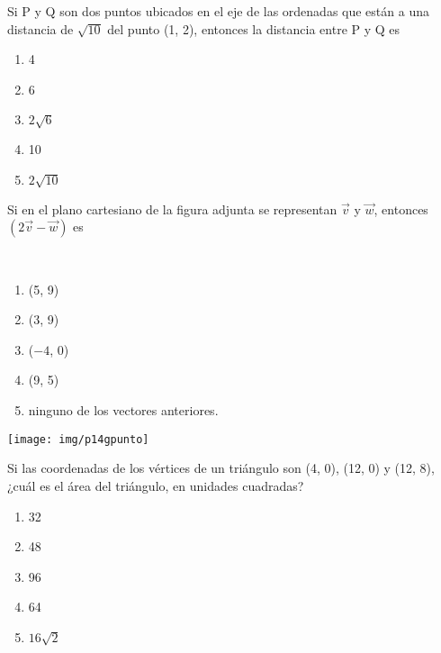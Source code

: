 \begin{enumerate}[label=\large{\textbf{\arabic*.}}, itemsep = 0.15cm, topsep = 0.5cm]
	\parbox{1\linewidth}{ \item Si P y Q son dos puntos ubicados en el eje de las ordenadas que están a una distancia de $\sqrt{10}$ del punto (1, 2), entonces la distancia entre P y Q es 
		\begin{enumerate}[label={\Alph*)}, itemsep = 0.15cm, topsep = 0.5cm]
			\item 4
			\item 6
			\item $2\sqrt{6}$
			\item 10
			\item $2\sqrt{10}$
	\end{enumerate}}
	
	\parbox{1\linewidth}{\item Si en el plano cartesiano de la figura adjunta se representan $\vec{v}$ y $\vec{w}$, entonces $(2\vec{v}-\vec{w})$  es
		
		\\	
		\begin{minipage}[t][3cm][t]{0.5\linewidth}
			\begin{enumerate}[label={\Alph*)}, itemsep = 0.15cm, topsep = 0.3cm]
				\item (5, 9)
				\item  (3, 9)
				\item  ($-4$, 0)
				\item (9, 5)
				\item ninguno de los vectores anteriores.
			\end{enumerate}
		\end{minipage}
		\begin{minipage}[t][1cm][t]{0.49\linewidth}
			\vspace{-0.5cm} %
			\hspace{1cm} %
			\texttt{[image: img/p14gpunto]} %
	\end{minipage}}
	
	\vspace*{2cm}
	
	\parbox{1\linewidth}{ \item Si las coordenadas de los vértices de un triángulo son (4, 0), (12, 0) y (12, 8), ¿cuál es el área del triángulo, en unidades cuadradas? 
		\begin{enumerate}[label={\Alph*)}, itemsep = 0.15cm, topsep = 0.5cm]
			\item 32 
			\item 48 
			\item 96 
			\item 64
			\item $16\sqrt{2}$
	\end{enumerate}}
	

\end{enumerate}
